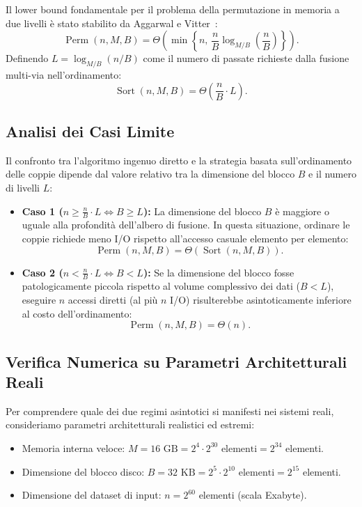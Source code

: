 Il lower bound fondamentale per il problema della permutazione in memoria a due livelli è stato stabilito da Aggarwal e Vitter~\cite{aggarwal1988}:
\begin{equation}
  \operatorname{Perm}(n, M, B) = \Theta\left(\min\left\{ n, \, \frac{n}{B} \log_{M/B}\left(\frac{n}{B}\right) \right\}\right).
\end{equation}
Definendo $L = \log_{M/B}(n/B)$ come il numero di passate richieste dalla fusione multi-via nell'ordinamento:
\begin{equation}
  \operatorname{Sort}(n, M, B) = \Theta\left(\frac{n}{B} \cdot L\right).
\end{equation}

\subsection{Analisi dei Casi Limite}
\label{subsec:corner-cases}

Il confronto tra l'algoritmo ingenuo diretto e la strategia basata sull'ordinamento delle coppie dipende dal valore relativo tra la dimensione del blocco $B$ e il numero di livelli $L$:
\begin{itemize}
  \item \textbf{Caso 1 ($n \ge \frac{n}{B} \cdot L \iff B \ge L$):}  
  La dimensione del blocco $B$ è maggiore o uguale alla profondità dell'albero di fusione. In questa situazione, ordinare le coppie richiede meno I/O rispetto all'accesso casuale elemento per elemento:
  \[
    \operatorname{Perm}(n, M, B) = \Theta(\operatorname{Sort}(n, M, B)).
  \]
  \item \textbf{Caso 2 ($n < \frac{n}{B} \cdot L \iff B < L$):}  
  Se la dimensione del blocco fosse patologicamente piccola rispetto al volume complessivo dei dati ($B < L$), eseguire $n$ accessi diretti (al più $n$ I/O) risulterebbe asintoticamente inferiore al costo dell'ordinamento:
  \[
    \operatorname{Perm}(n, M, B) = \Theta(n).
  \]
\end{itemize}

\subsection{Verifica Numerica su Parametri Architetturali Reali}
\label{subsec:numerical-check}

Per comprendere quale dei due regimi asintotici si manifesti nei sistemi reali, consideriamo parametri architetturali realistici ed estremi:
\begin{itemize}
  \item Memoria interna veloce: $M = 16\text{ GB} = 2^4 \cdot 2^{30} \text{ elementi} = 2^{34}$ elementi.
  \item Dimensione del blocco disco: $B = 32\text{ KB} = 2^5 \cdot 2^{10} \text{ elementi} = 2^{15}$ elementi.
  \item Dimensione del dataset di input: $n = 2^{60}$ elementi (scala Exabyte).
\end{itemize}

